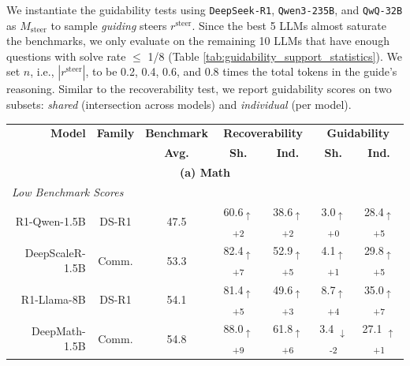 \documentclass{article} %
\begin{document}
We instantiate the guidability tests using \texttt{DeepSeek-R1}, \texttt{Qwen3-235B}, and \texttt{QwQ-32B} as $M_\mathrm{steer}$ to sample \textit{guiding} steers $r^\mathrm{steer}$. Since the best 5 LLMs almost saturate the benchmarks, we only evaluate on the remaining 10 LLMs that have enough questions with solve rate $\leq$ 1/8 (Table \ref{tab:guidability_support_statistics}). We set $n$, i.e., $|r^\mathrm{steer}|$, to be 0.2, 0.4, 0.6, and 0.8 times the total tokens in the guide's reasoning. Similar to the recoverability test, we report guidability scores on two subsets: \textit{shared} (intersection across models) and \textit{individual} (per model).


\begin{table}[t]
  \centering
  \small
  \begin{tabular}{r|c|c|cc|cc}
    \toprule
    \textbf{Model} &
    \textbf{Family} &
    \multicolumn{1}{c|}{\textbf{Benchmark}} &
    \multicolumn{2}{c|}{\textbf{Recoverability}} &
    \multicolumn{2}{c}{\textbf{Guidability}} \\
    &  & \multicolumn{1}{c|}{\textbf{Avg.}} &
    \textbf{Sh.} & \textbf{Ind.} & \textbf{Sh.} & \textbf{Ind.} \\
    \midrule
    \multicolumn{7}{c}{\textbf{(a) Math}} \\
    \midrule
    \multicolumn{7}{l}{\textit{Low Benchmark Scores}} \\
    \midrule

    R1-Qwen-1.5B    & DS-R1 &  47.5 & \cellcolor{green!12}60.6\textsubscript{$\uparrow$+2} & \cellcolor{green!12}38.6\textsubscript{$\uparrow$+2} &
    \cellcolor{green!0}3.0\textsubscript{$\uparrow$+0} &
    \cellcolor{green!15}28.4\textsubscript{$\uparrow$+5} \\

    DeepScaleR-1.5B         & Comm. & 53.3 & \cellcolor{green!27}82.4\textsubscript{$\uparrow$+7} & \cellcolor{green!15}52.9\textsubscript{$\uparrow$+5} &
    \cellcolor{green!11}4.1\textsubscript{$\uparrow$+1} &
    \cellcolor{green!15}29.8\textsubscript{$\uparrow$+5} \\

    R1-Llama-8B     & DS-R1 & 54.1 &
    \cellcolor{green!15}81.4\textsubscript{$\uparrow$+5} & \cellcolor{green!13}49.6\textsubscript{$\uparrow$+3} &
    \cellcolor{green!14}8.7\textsubscript{$\uparrow$+4} &
    \cellcolor{green!27}35.0\textsubscript{$\uparrow$+7} \\

    DeepMath-1.5B           & Comm. & 54.8 & \cellcolor{green!29}88.0\textsubscript{$\uparrow$+9} & \cellcolor{green!16}61.8\textsubscript{$\uparrow$+6} &
    \cellcolor{red!12} 3.4 \textsubscript{$\downarrow$-2} &
    \cellcolor{green!11} 27.1 \textsubscript{$\uparrow$+1} \\


\end{tabular}
\end{table}
\end{document}
